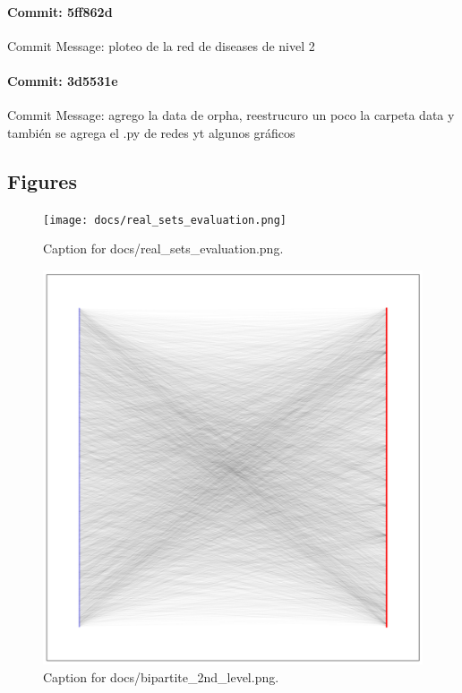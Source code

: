 \documentclass{article}
\begin{document}
\paragraph{Commit: 5ff862d}
Commit Message: ploteo de la red de diseases de nivel 2

\paragraph{Commit: 3d5531e}
Commit Message: agrego la data de orpha, reestrucuro un poco la carpeta data y también se agrega el .py de redes yt algunos gráficos

\subsection{Figures}
\begin{figure}[h] \centering \texttt{[image: docs/real\_sets\_evaluation.png]} \caption{Caption for docs/real_sets_evaluation.png.} \end{figure}
\begin{figure}[h] \centering \includegraphics{docs/bipartite_2nd_level.png} \caption{Caption for docs/bipartite_2nd_level.png.} \end{figure}
\end{document}
